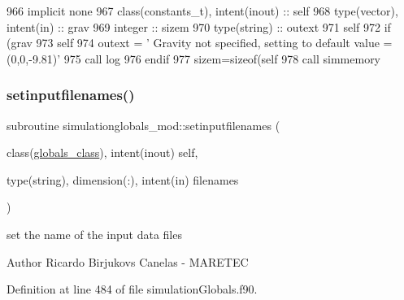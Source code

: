 \begin{DoxyCode}
966     \textcolor{keywordtype}{implicit none}
967     \textcolor{keywordtype}{class}(constants\_t), \textcolor{keywordtype}{intent(inout)} :: self
968     \textcolor{keywordtype}{type}(vector), \textcolor{keywordtype}{intent(in)} :: grav
969     \textcolor{keywordtype}{integer} :: sizem
970     \textcolor{keywordtype}{type}(string) :: outext
971     self%
972     \textcolor{keywordflow}{if} (grav%
973         self%
974         outext = \textcolor{stringliteral}{'       Gravity not specified, setting to default value = (0,0,-9.81)'}
975         \textcolor{keyword}{call }log%
976 \textcolor{keywordflow}{    endif}
977     sizem=sizeof(self%
978     \textcolor{keyword}{call }simmemory%
\end{DoxyCode}
\mbox{\label{namespacesimulationglobals__mod_a422e3d203aad010489f541f645f63517}} 
\subsubsection{\texorpdfstring{setinputfilenames()}{setinputfilenames()}}
{\footnotesize\ttfamily subroutine simulationglobals\+\_\+mod\+::setinputfilenames (\begin{DoxyParamCaption}\item[{class(\mbox{\hyperlink{structsimulationglobals__mod_1_1globals__class}{globals\+\_\+class}}), intent(inout)}]{self,  }\item[{type(string), dimension(\+:), intent(in)}]{filenames }\end{DoxyParamCaption})\hspace{0.3cm}{\ttfamily [private]}}



set the name of the input data files 

\begin{DoxyAuthor}{Author}
Ricardo Birjukovs Canelas -\/ M\+A\+R\+E\+T\+EC 
\end{DoxyAuthor}


Definition at line 484 of file simulation\+Globals.\+f90.


